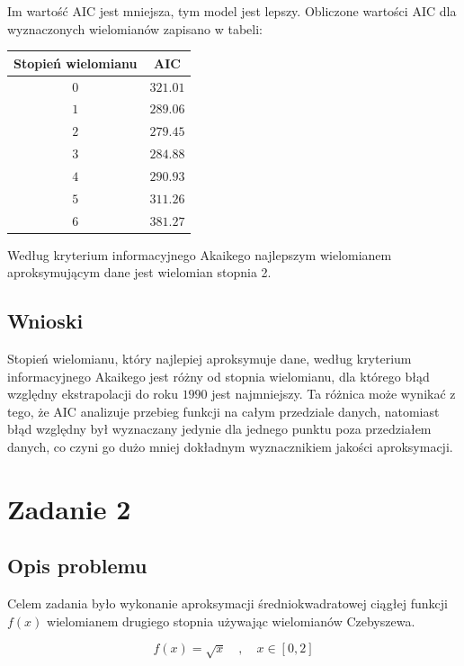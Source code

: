 \documentclass{article}
\begin{document}
	Im wartość AIC jest mniejsza, tym model jest lepszy. Obliczone wartości AIC dla wyznaczonych wielomianów zapisano w tabeli:
	
	\begin{center}
		\begin{tabular}{c|c}
  			\hline 
  			Stopień wielomianu & AIC\\
  			\hline
  			$0$ & $321.01$ \\
  			$1$ & $289.06$ \\
  			$2$ & $279.45$ \\
  			$3$ & $284.88$ \\
  			$4$ & $290.93$ \\
  			$5$ & $311.26$ \\
  			$6$ & $381.27$ \\
		\end{tabular} 
		
	\end{center}	
	
	
	Według kryterium informacyjnego Akaikego najlepszym wielomianem aproksymującym dane jest wielomian stopnia 2. 
	
	\subsection*{Wnioski}	
	
	Stopień wielomianu, który najlepiej aproksymuje dane, według kryterium informacyjnego Akaikego jest różny od stopnia wielomianu, dla którego błąd względny ekstrapolacji do roku $1990$ jest najmniejszy. Ta różnica może wynikać z tego, że AIC analizuje przebieg funkcji na całym przedziale danych, natomiast błąd względny był wyznaczany jedynie dla jednego punktu poza przedziałem danych, co czyni go dużo mniej dokładnym wyznacznikiem jakości aproksymacji.
	
	\newpage
	
	\section*{Zadanie 2}
	
	\subsection*{Opis problemu}
	
	Celem zadania było wykonanie aproksymacji średniokwadratowej ciągłej funkcji $f(x)$ wielomianem drugiego stopnia używając wielomianów Czebyszewa.
	
	\begin{equation}
		f(x) = \sqrt{x} \quad , \quad x \in [0, 2]
	\end{equation}
	
\end{document}
